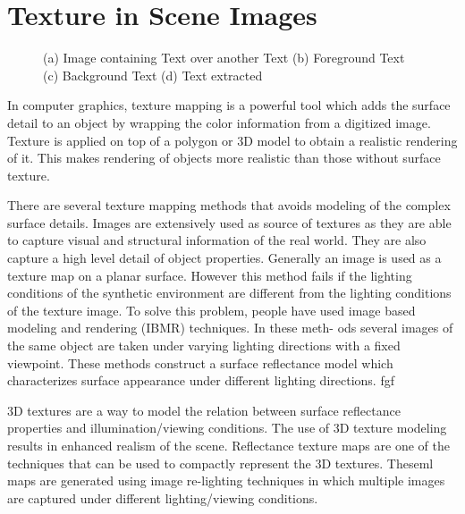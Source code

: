 
\section{Texture in Scene Images}
\begin{figure}[p]
\centering
{}
\caption
{(a) Image containing Text over another Text (b) Foreground Text (c) Background Text (d)
Text extracted}
\end{figure}
In computer graphics, texture mapping is a powerful tool which adds the surface detail to an object by wrapping
the color information from a digitized image. 
Texture is applied on top of a
polygon or 3D model to obtain a realistic rendering of it.
This makes rendering of objects more realistic than those without
surface texture. 

There are several texture mapping methods that avoids
modeling of the complex surface details. 
Images are extensively
used as source of textures as they are able to capture visual and structural information of the real world. They
are also capture a high level detail of object properties.
Generally an image is used as a texture map
on a planar surface. However this method fails if the lighting conditions of the synthetic
environment are different from the lighting conditions of the texture image. To solve this
problem, people have used image based modeling and rendering (IBMR) techniques. In these meth-
ods several images of the same object are taken under varying lighting directions with a fixed
viewpoint. These methods construct a surface reflectance model which characterizes surface
appearance under different lighting directions. fgf

3D textures are a way to model the relation between surface reflectance
properties and illumination/viewing conditions. The use of 3D texture modeling
results in enhanced realism of the scene. Reflectance texture maps are one of
the techniques that can be used to compactly represent the 3D textures. Theseml
maps are generated using image re-lighting techniques in which
multiple images are captured under different lighting/viewing conditions.


